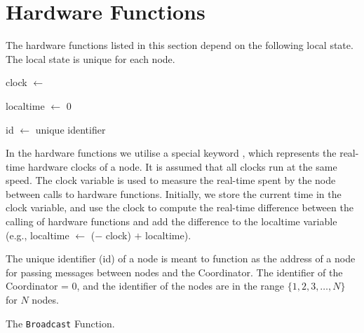 \section{Hardware Functions}\label{sec:hwfuncspseudo}
The hardware functions listed in this section depend on the following local state. The local state is unique for each node.\smallbreak

clock $\leftarrow$ \KwNow

localtime $\leftarrow$ 0

id $\leftarrow$ unique identifier \smallbreak

In the hardware functions we utilise a special keyword \KwNow, which represents the real-time hardware clocks of a node. It is assumed that all clocks run at the same speed. The clock variable is used to measure the real-time spent by the node between calls to hardware functions. Initially, we store the current time in the clock variable, and use the clock to compute the real-time difference between the calling of hardware functions and add the difference to the localtime variable (e.g., localtime $\leftarrow$ (\KwNow $-$ clock) $+$ localtime).

The unique identifier (id) of a node is meant to function as the address of a node for passing messages between nodes and the Coordinator. The identifier of the Coordinator = $0$, and the identifier of the nodes are in the range $\{ 1, 2, 3, \ldots, N \}$ for $N$ nodes.


\begin{algorithm}[ht]
    \DontPrintSemicolon
    

    \caption{The \texttt{Broadcast} Function.}
    \label{algo:hwfuncstransmit}
\end{algorithm}

